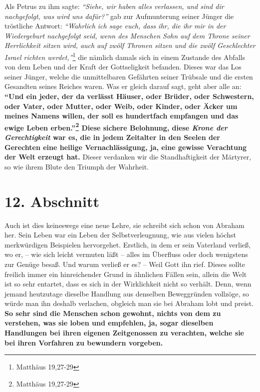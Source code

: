 Als Petrus zu ihm sagte:
\textit{"`Siehe, wir haben alles verlassen, und sind dir
nachgefolgt, was wird uns dafür?"'}
gab zur Aufmunterung seiner Jünger die tröstliche Antwort:
\textit{"`Wahrlich ich sage euch, dass ihr, die ihr mir in der
Wiedergeburt nachgefolgt seid, wenn des Menschen Sohn auf dem Throne seiner
Herrlichkeit sitzen wird, auch auf zwölf Thronen sitzen und die zwölf
Geschlechter Israel richten werdet,"'}\footnote{Matthäus  19,27-29}
die nämlich
damals sich in einem Zustande des Abfalls von dem Leben und der Kraft der
Gottseligkeit befanden. Dieses war das Los seiner Jünger, welche die
unmittelbaren Gefährten seiner Trübsale und die ersten Gesandten seines
Reiches waren. Was er gleich darauf sagt, geht aber alle an:
\textbf{ "`Und ein
jeder, der da verlässt Häuser, oder Brüder, oder Schwestern, oder Vater, oder
Mutter, oder Weib, oder Kinder, oder Äcker um meines Namens willen, der
soll es hundertfach empfangen und das ewige Leben erben."'\footnote{Matthäus
19,27-29}
Diese sichere Belohnung, diese
\textit{Krone der Gerechtigkeit} 
war es, die in jedem Zeitalter in den Seelen der Gerechten
eine heilige Vernachlässigung, ja, eine gewisse Verachtung der Welt erzeugt
hat.} Dieser verdanken wir die Standhaftigkeit der Märtyrer,
so wie ihrem
Blute den Triumph der Wahrheit.
\label{ref:04_10_pilger_ende}

\section{12. Abschnitt} \label{kap4_ab12}

Auch ist dies keineswegs eine neue Lehre, sie schreibt sich schon von
Abraham  her. Sein Leben war ein Leben der
Selbstverleugnung, wie aus vielen
höchst merkwürdigen Beispielen hervorgehet. Erstlich, in dem er sein Vaterland
verließ, wo er, -- wie sich leicht vermuten läßt -- alles im Überfluss oder
doch wenigstens zur Genüge besaß. Und warum verließ er es? -- Weil Gott ihn
rief. Dieses sollte freilich immer ein hinreichender Grund in ähnlichen Fällen
sein, allein die Welt ist so sehr entartet, dass es sich in der Wirklichkeit
nicht so verhält. Denn, wenn jemand heutzutage dieselbe Handlung aus denselben
Beweggründen vollzöge, so würde man ihn deshalb verlachen, obgleich man sie bei
Abraham lobt und preist.
\label{ref:04_12_tugend}
\textbf{So sehr sind die Menschen schon gewohnt, nichts von
dem zu verstehen, was sie loben und empfehlen, ja, sogar dieselben Handlungen
bei ihren eigenen Zeitgenossen zu verachten, welche sie bei ihren Vorfahren zu
bewundern vorgeben.}

